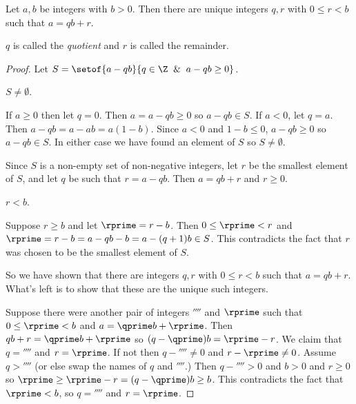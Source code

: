 \documentclass[oneside,12pt]{amsart}
\begin{document}
\begin{theorem}
Let $a,b$ be integers with $b>0$. Then there are unique
integers $q,r$ with $0\leq r < b$
such that $a = qb+r$.

$q$ is called the \emph{quotient} and $r$ is called the remainder.
\end{theorem}
\begin{proof}
Let $S=\setof{a-qb}{q\in\Z\And a-qb\geq 0}$.

\begin{claim}[Claim 1]
$S\not=\emptyset$.
\end{claim}

\begin{subproof}
If $a\geq 0$ then let $q=0$. Then $a=a-qb\geq0$ so $a-qb\in S$.
If $a<0$, let $q=a$. Then $a-qb=a-ab=a(1-b)$. Since $a<0$ and $1-b\leq 0$,
$a-qb\geq 0$ so $a-qb\in S$. In either case we have found an element of $S$
so $S\not=\emptyset$.
\end{subproof}

Since $S$ is a non-empty set of non-negative integers, let $r$ be the smallest element of $S$,
and let $q$ be such that $r=a-qb$. Then $a=qb+r$ and $r\geq 0$.

\begin{claim}[Claim 2]
$r<b$.
\end{claim}

\begin{subproof}
Suppose $r\geq b$ and let $\rprime = r -b$. Then $0\leq\rprime < r$ and
$\rprime = r - b = a-qb -b = a -(q+1) b \in S$. This contradicts the fact that
$r$ was chosen to be the smallest element of $S$.
\end{subproof}

So we have shown that there are integers $q,r$ with $0\leq r < b$
such that $a = qb+r$. What's left is to show that these are the unique such integers.

Suppose there were another pair of integers $\qprime$ and $\rprime$ such that
$0\leq \rprime < b$ and $a = \qprime b+\rprime$. Then
$qb+r = \qprime b + \rprime$ so $(q - \qprime)b = \rprime-r$. We claim
that $q=\qprime$ and $r=\rprime$. If not then  $q-\qprime\not=0$ and
$r-\rprime\not=0$.  Assume $q>\qprime$ (or else swap the names of $q$ and $\qprime$.)
Then $q-\qprime > 0$ and $b>0$ and $r\geq 0$ so
$\rprime \geq \rprime-r = (q - \qprime)b \geq b$.
This contradicts the fact that $\rprime < b$, so $q=\qprime$ and $r=\rprime$.
\end{proof}
\end{document}
